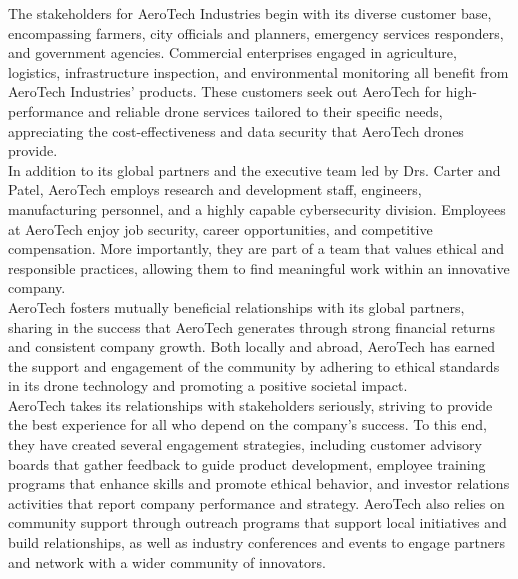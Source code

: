 The stakeholders for AeroTech Industries begin with its diverse customer base, encompassing farmers, city officials and planners, emergency services responders, and government agencies. Commercial enterprises engaged in agriculture, logistics, infrastructure inspection, and environmental monitoring all benefit from AeroTech Industries' products. These customers seek out AeroTech for high-performance and reliable drone services tailored to their specific needs, appreciating the cost-effectiveness and data security that AeroTech drones provide.
\\
In addition to its global partners and the executive team led by Drs. Carter and Patel, AeroTech employs research and development staff, engineers, manufacturing personnel, and a highly capable cybersecurity division. Employees at AeroTech enjoy job security, career opportunities, and competitive compensation. More importantly, they are part of a team that values ethical and responsible practices, allowing them to find meaningful work within an innovative company.
\\
AeroTech fosters mutually beneficial relationships with its global partners, sharing in the success that AeroTech generates through strong financial returns and consistent company growth. Both locally and abroad, AeroTech has earned the support and engagement of the community by adhering to ethical standards in its drone technology and promoting a positive societal impact.
\\
AeroTech takes its relationships with stakeholders seriously, striving to provide the best experience for all who depend on the company's success. To this end, they have created several engagement strategies, including customer advisory boards that gather feedback to guide product development, employee training programs that enhance skills and promote ethical behavior, and investor relations activities that report company performance and strategy. AeroTech also relies on community support through outreach programs that support local initiatives and build relationships, as well as industry conferences and events to engage partners and network with a wider community of innovators.
